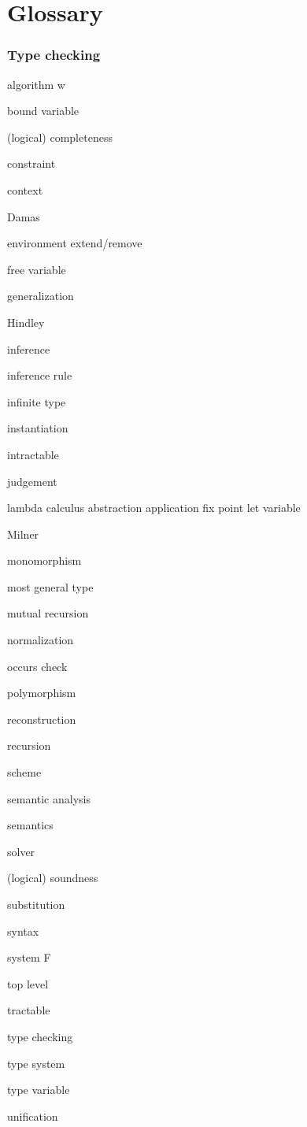 \chapter{Glossary}

\subsection{Type checking}

algorithm w

bound variable

(logical) completeness


constraint

context

Damas

environment
  extend/remove

free variable

generalization

Hindley

inference

inference rule

infinite type

instantiation

intractable

judgement

lambda calculus
  abstraction
  application
  fix point
  let
  variable

Milner

monomorphism

most general type

mutual recursion

normalization

occurs check

polymorphism

reconstruction

recursion

scheme

semantic analysis

semantics

solver

(logical) soundness

substitution

syntax

system F

top level

tractable

type checking

type system

type variable

unification


